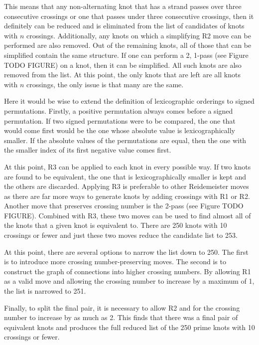\begin{paper}
This means that any non-alternating knot that has a strand passes over three
consecutive crossings or one that passes under three consecutive crossings, then
it definitely can be reduced and is eliminated from the list of candidates of
knots with $n$ crossings.
Additionally, any knots on which a simplifying R2 move can be performed are also
removed.
Out of the remaining knots, all of those that can be simplified contain the same
structure.
If one can perform a 2, 1-pass (see Figure TODO FIGURE) on a knot, then it can
be simplified.
All such knots are also removed from the list.
At this point, the only knots that are left are all knots with $n$ crossings,
the only issue is that many are the same.

Here it would be wise to extend the definition of lexicographic orderings to
signed permutations.
Firstly, a positive permutation always comes before a signed permutation.
If two signed permutations were to be compared, the one that would come first
would be the one whose absolute value is lexicographically smaller.
If the absolute values of the permutations are equal, then the one with the
smaller index of its first negative value comes first.

At this point, R3 can be applied to each knot in every possible way.
If two knots are found to be equivalent, the one that is lexicographically
smaller is kept and the others are discarded.
Applying R3 is preferable to other Reidemeister moves as there are far more ways
to generate knots by adding crossings with R1 or R2.
Another move that preserves crossing number is the 2-pass (see Figure TODO
FIGURE).
Combined with R3, these two moves can be used to find almost all of the knots
that a given knot is equivalent to.
There are 250 knots with 10 crossings or fewer and just these two moves reduce
the candidate list to 253.

At this point, there are several options to narrow the list down to 250.
The first is to introduce more crossing number-preserving moves.
The second is to construct the graph of connections into higher crossing
numbers.
By allowing R1 as a valid move and allowing the crossing number to increase by a
maximum of 1, the list is narrowed to 251.

Finally, to split the final pair, it is necessary to allow R2 and for the
crossing number to increase by as much as 2.
This finds that there was a final pair of equivalent knots and produces the full
reduced list of the 250 prime knots with 10 crossings or fewer.
\end{paper}

